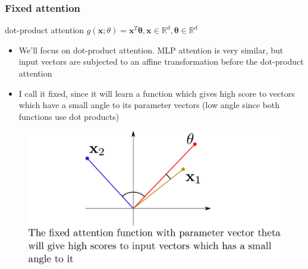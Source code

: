 \documentclass{beamer}
\renewcommand{\vec}[1]{{\boldsymbol{#1}}}
\begin{document}
\begin{frame}
  \frametitle{Fixed attention}
  \begin{block}{dot-product attention} $g(\vec{x}; \theta) = \vec{x}^T \vec{\theta}, \vec{x} \in \mathbb{R}^d, \vec{\theta} \in \mathbb{R}^d$
\end{block}

  \begin{itemize}

  \item We'll focus on dot-product attention. MLP attention is very similar, but input vectors are subjected to an affine transformation before the dot-product attention

  \item I call it fixed, since it will learn a function which gives high score to vectors which have a small angle to its parameter vectors (low angle since both functions use dot products)
  \end{itemize}
\vfill
    \begin{figure}
    \includegraphics[scale=0.3]{fixed_attention}
    \end{figure}

\end{frame}
\end{document}
